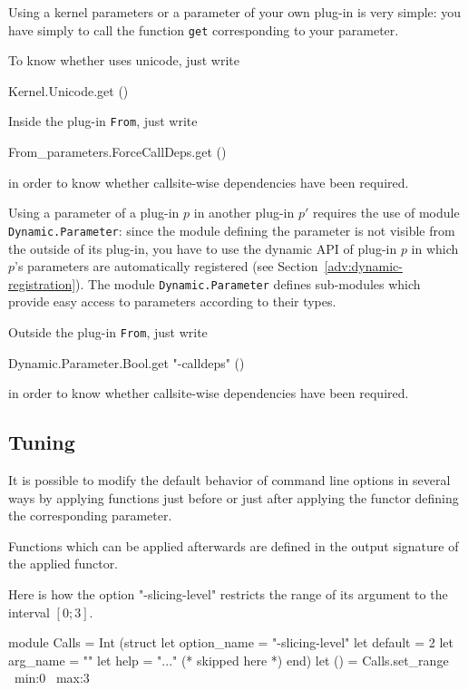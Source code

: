 Using a kernel parameters or a parameter of your own plug-in is very simple:
you have simply to call the function \texttt{get} corresponding to your
parameter.
\begin{example}
To know whether \framac uses unicode, just write
\begin{ocamlcode}
Kernel.Unicode.get ()
\end{ocamlcode}

Inside the plug-in \texttt{From}, just write
\begin{ocamlcode}
From_parameters.ForceCallDeps.get ()
\end{ocamlcode}
in order to know whether callsite-wise dependencies have been required.
\end{example}

Using a parameter of a plug-in $p$ in another plug-in $p'$ requires the use of
module \texttt{Dynamic.Parameter}: since the
module defining the parameter is not visible from the outside of its plug-in,
you have to use the dynamic API of plug-in $p$ in which $p$'s parameters are
automatically registered (see Section~\ref{adv:dynamic-registration}). The
module \texttt{Dynamic.Parameter} defines sub-modules which provide easy access
to parameters according to their \caml types.
\begin{example}
Outside the plug-in \texttt{From}, just write
\begin{ocamlcode}
Dynamic.Parameter.Bool.get "-calldeps" ()
\end{ocamlcode}
in order to know whether callsite-wise dependencies have been required.
\end{example}

\subsection{Tuning}\label{options:tuning}

It is possible to modify the default behavior of command line options in several
ways by applying functions just before or just after applying the functor
defining the corresponding parameter. 

Functions which can be applied afterwards are defined in the output signature of
the applied functor.
\begin{example}
Here is how the option "-slicing-level" restricts the range of its argument to
the interval $[0;3]$.
\begin{ocamlcode}
module Calls =
  Int
    (struct
       let option_name = "-slicing-level"
       let default = 2
       let arg_name = ""
       let help = "..." (* skipped here *)
       end)
let () = Calls.set_range ~min:0 ~max:3
\end{ocamlcode}
\end{example}

